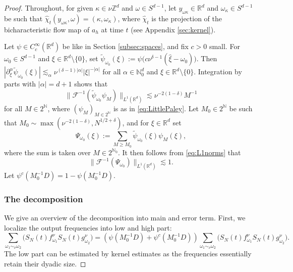 \documentclass{amsart}
\numberwithin{equation}{section}
\theoremstyle{definition}
\newcommand{\Rd}{\mathbb{R}^{d}}
\newcommand{\N}{\mathbb{N}}
\newcommand{\Z}{\mathbb{Z}}
\newcommand{\F}{\mathcal{F}}
\newcommand {\ka}{\kappa}
\newcommand {\w}{\omega}
\begin{document}
\begin{proof}
Throughout, for given $\ka\in\nu\Z^{d}$ and $\w\in S^{d-1}$, let $y_{\w\ka}\in\Rd$ and $\w_{\ka}\in S^{d-1}$ be such that $\hat{\chi}_{t}(y_{\w\ka},\w)=(\ka,\w_{\ka})$, where $\hat{\chi}_{t}$ is the projection of the bicharacteristic flow map of $a_{h}$ at time $t$ (see Appendix \ref{sec:kernel}).

Let $\psi\in C^{\infty}_{c}(\Rd)$ be like in Section \ref{subsec:spaces}, and fix $c>0$ small. For $\w_{0}\in S^{d-1}$ and $\xi\in\Rd\setminus\{0\}$, set $\tilde{\psi}_{\w_{0}}(\xi):=\psi\big(c\nu^{\delta-1}(\hat{\xi}-\w_{0})\big)$. Then $|\partial_{\xi}^{\alpha}\tilde{\psi}_{\w_{0}}(\xi)|\lesssim_{\alpha} \nu^{(\delta-1)|\alpha|}|\xi|^{-|\alpha|}$ %
for all $\alpha\in\N_{0}^{d}$ and $\xi\in\Rd\setminus\{0\}$. Integration by parts with $|\alpha|=d+1$ shows that
\begin{equation}\label{eq:L1norms}
\|\F^{-1}(\tilde{\psi}_{\w_{0}}\psi_{M})\|_{L^{1}(\Rd)}%
\lesssim \nu^{-2(1-\delta)}M^{-1} 
\end{equation}
for all $M\in 2^{\N}$, where $(\psi_{M})_{M\in 2^{\N}}$ is as in \eqref{eq:LittlePaley}. Let $M_{0}\in 2^{\N}$ be such that $M_{0} \sim \max(\nu^{-2(1-\delta)},N^{1/2+\delta})$, and for $\xi\in\Rd$ set
\[
\Psi_{\w_{0}}(\xi):=\sum_{M\geq M_{0}}\tilde{\psi}_{\w_{0}}(\xi)\psi_{M}(\xi),%
\]
where the sum is taken over $M\in 2^{\N_{0}}$. 
It then follows from \eqref{eq:L1norms} that %
\begin{equation}\label{eq:L1norm}
\|\F^{-1}(\Psi_{\w_{0}})\|_{L^{1}(\Rd)}\lesssim 1.
\end{equation}
Let $\psi^c(M_0^{-1}D) = 1 - \psi(M_0^{-1} D)$.

\subsubsection*{The decomposition}

We give an overview of the decomposition into main and error term. First, we localize the output frequencies into low and high part:
\begin{equation*}
    \sum_{\w_{1}\sim_{\nu}\w_{2}} \big(S_{N}(t)f^{\nu}_{\w_{1}}S_{N}(t)g^{\nu}_{\w_{2}}\big) = (\psi(M_0^{-1} D) + \psi^c(M_0^{-1} D)) \sum_{\w_{1}\sim_{\nu}\w_{2}} \big(S_{N}(t)f^{\nu}_{\w_{1}}S_{N}(t)g^{\nu}_{\w_{2}}\big).
\end{equation*}
The low part can be estimated by kernel estimates as the frequencies essentially retain their dyadic size.


\end{proof}
\end{document}

